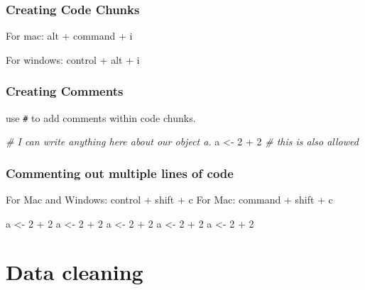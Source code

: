 \documentclass[
]{book}
\newenvironment{Shaded}{\begin{snugshade}}{\end{snugshade}}
\newcommand{\CommentTok}[1]{\textcolor[rgb]{0.56,0.35,0.01}{\textit{#1}}}
\newcommand{\DecValTok}[1]{\textcolor[rgb]{0.00,0.00,0.81}{#1}}
\newcommand{\NormalTok}[1]{#1}
\newcommand{\OtherTok}[1]{\textcolor[rgb]{0.56,0.35,0.01}{#1}}
\newcommand{\SpecialCharTok}[1]{\textcolor[rgb]{0.00,0.00,0.00}{#1}}
\begin{document}
\hypertarget{creating-code-chunks}{%
\subsection{Creating Code Chunks}\label{creating-code-chunks}}

For mac: alt + command + i

For windows: control + alt + i

\hypertarget{creating-comments}{%
\subsection{Creating Comments}\label{creating-comments}}

use \texttt{\#} to add comments within code chunks.

\begin{Shaded}
\begin{Highlighting}[]
\CommentTok{\# I can write anything here about our object a.}
\NormalTok{a }\OtherTok{\textless{}{-}} \DecValTok{2} \SpecialCharTok{+} \DecValTok{2} \CommentTok{\# this is also allowed}
\end{Highlighting}
\end{Shaded}

\hypertarget{commenting-out-multiple-lines-of-code}{%
\subsection{Commenting out multiple lines of code}\label{commenting-out-multiple-lines-of-code}}

For Mac and Windows: control + shift + c For Mac: command + shift + c

\begin{Shaded}
\begin{Highlighting}[]
\NormalTok{a }\OtherTok{\textless{}{-}} \DecValTok{2} \SpecialCharTok{+} \DecValTok{2}
\NormalTok{a }\OtherTok{\textless{}{-}} \DecValTok{2} \SpecialCharTok{+} \DecValTok{2}
\NormalTok{a }\OtherTok{\textless{}{-}} \DecValTok{2} \SpecialCharTok{+} \DecValTok{2}
\NormalTok{a }\OtherTok{\textless{}{-}} \DecValTok{2} \SpecialCharTok{+} \DecValTok{2}
\NormalTok{a }\OtherTok{\textless{}{-}} \DecValTok{2} \SpecialCharTok{+} \DecValTok{2}
\end{Highlighting}
\end{Shaded}

\hypertarget{data-cleaning}{%
\chapter{Data cleaning}\label{data-cleaning}}
\end{document}
